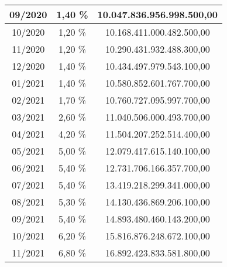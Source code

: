 \begin{center}
\begin{longtable}{|c|c|c|}
09/2020 & 1,40 \% & 10.047.836.956.998.500,00 \\ \hline
10/2020 & 1,20 \% & 10.168.411.000.482.500,00 \\ \hline
11/2020 & 1,20 \% & 10.290.431.932.488.300,00 \\ \hline
12/2020 & 1,40 \% & 10.434.497.979.543.100,00 \\ \hline
01/2021 & 1,40 \% & 10.580.852.601.767.700,00 \\ \hline
02/2021 & 1,70 \% & 10.760.727.095.997.700,00 \\ \hline
03/2021 & 2,60 \% & 11.040.506.000.493.700,00 \\ \hline
04/2021 & 4,20 \% & 11.504.207.252.514.400,00 \\ \hline
05/2021 & 5,00 \% & 12.079.417.615.140.100,00 \\ \hline
06/2021 & 5,40 \% & 12.731.706.166.357.700,00 \\ \hline
07/2021 & 5,40 \% & 13.419.218.299.341.000,00 \\ \hline
08/2021 & 5,30 \% & 14.130.436.869.206.100,00 \\ \hline
09/2021 & 5,40 \% & 14.893.480.460.143.200,00 \\ \hline
10/2021 & 6,20 \% & 15.816.876.248.672.100,00 \\ \hline
11/2021 & 6,80 \% & 16.892.423.833.581.800,00 \\ \hline
\end{longtable} 
\end{center}